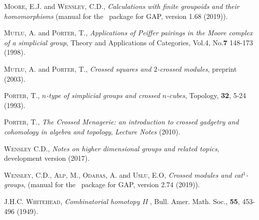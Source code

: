 \documentclass[a4paper,11pt]{article}
\theoremstyle{plain}
\theoremstyle{definition}
\begin{document}
\begin{thebibliography}{99}
	 \textsc{Moore, E.J.} and \textsc{Wensley, C.D.}, 
	\emph{Calculations with finite groupoids and their homomorphisms}  
	{(manual for the \groupoids\ package for \textsf{GAP}, version 1.68   
	(2019))}. 

	 \textsc{Mutlu, A.} and \textsc{Porter, T.}, 
	\emph{Applications of Peiffer pairings in the Moore complex 
	of a simplicial group}, 
	Theory and Applications of Categories,  
	Vol.4, No.\textbf{7} 148-173 (1998).
	
	 \textsc{Mutlu, A.} and \textsc{Porter, T.}, 
	\emph{Crossed squares and $2$-crossed modules}, 
	preprint (2003).
	
	 \textsc{Porter, T.}, 
	\emph{$n$-type of simplicial groups and crossed $n$-cubes}, 
	Topology, \textbf{32}, 5-24 (1993).
	
	 \textsc{Porter, T.}, 
	\emph{The Crossed Menagerie: an introduction to crossed gadgetry and cohomology 
	in algebra and topology},  
	\emph{Lecture Notes} (2010).
	
	 \textsc{Wensley C.D.},  
	\emph{Notes on higher dimensional groups and related topics}, 
	development version (2017).
	
	 \textsc{Wensley, C.D.}, \textsc{Alp, M.}, 
	               \textsc{Odabas, A.} and \textsc{Uslu, E.O},  
	\emph{Crossed modules and cat$^{1}$-groups}, 
	{(manual for the \XMod\ package for \textsf{GAP}, version 2.74 (2019))}. 
	
	 \textsc{J.H.C. Whitehead}, 
	\emph{Combinatorial homotopy II }, 
	Bull. Amer. Math. Soc., \textbf{55}, 453-496 (1949).
	
\end{thebibliography}
\end{document}
